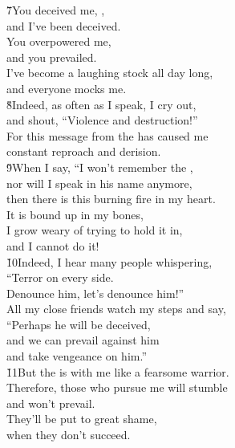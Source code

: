 \begin{poetry}
\poeml \v{7}You deceived me, , \\
\poemll    and I've been deceived. \\
\poeml You overpowered me, \\
\poemll    and you prevailed. \\
\poeml I've become a laughing stock all day long, \\
\poemll    and everyone mocks me. \\
\poeml \v{8}Indeed, as often as I speak, I cry out, \\
\poemll    and shout, ``Violence and destruction!'' \\
\poeml For this message from the  has caused me \\
\poemll    constant reproach and derision. \\
\poeml \v{9}When I say, ``I won't remember the , \\
\poemll    nor will I speak in his name anymore, \\
\poeml then there is this burning fire in my heart. \\
\poemll    It is bound up in my bones, \\
\poeml I grow weary of trying to hold it in, \\
\poemll    and I cannot do it! \\
\poeml \v{10}Indeed, I hear many people whispering, \\
\poemll    ``Terror on every side. \\
\poeml Denounce him, let's denounce him!'' \\
\poemll    All my close friends watch my steps and say, \\
\poeml ``Perhaps he will be deceived, \\
\poemll    and we can prevail against him \\
\poemlll       and take vengeance on him.'' \\
\poeml \v{11}But the  is with me like a fearsome warrior. \\
\poemll    Therefore, those who pursue me will stumble \\
\poemlll       and won't prevail. \\
\poeml They'll be put to great shame, \\
\poemll    when they don't succeed. \\

\end{poetry}
